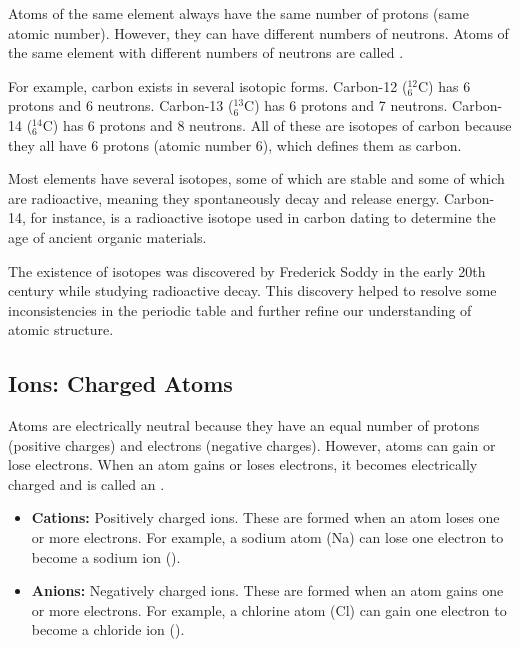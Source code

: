 Atoms of the same element always have the same number of protons (same atomic number). However, they can have different numbers of neutrons. Atoms of the same element with different numbers of neutrons are called .

For example, carbon exists in several isotopic forms.  Carbon-12 ($^{12}_{6}\text{C}$) has 6 protons and 6 neutrons. Carbon-13 ($^{13}_{6}\text{C}$) has 6 protons and 7 neutrons. Carbon-14 ($^{14}_{6}\text{C}$) has 6 protons and 8 neutrons. All of these are isotopes of carbon because they all have 6 protons (atomic number 6), which defines them as carbon.

Most elements have several isotopes, some of which are stable and some of which are radioactive, meaning they spontaneously decay and release energy. Carbon-14, for instance, is a radioactive isotope used in carbon dating to determine the age of ancient organic materials.

\begin{marginnote}
 The existence of isotopes was discovered by Frederick Soddy in the early 20th century while studying radioactive decay.  This discovery helped to resolve some inconsistencies in the periodic table and further refine our understanding of atomic structure.
\end{marginnote}

\subsection{Ions: Charged Atoms}

Atoms are electrically neutral because they have an equal number of protons (positive charges) and electrons (negative charges). However, atoms can gain or lose electrons. When an atom gains or loses electrons, it becomes electrically charged and is called an .

\begin{itemize}
    \item \textbf{Cations:}  Positively charged ions. These are formed when an atom loses one or more electrons. For example, a sodium atom (Na) can lose one electron to become a sodium ion ().
    \item \textbf{Anions:} Negatively charged ions. These are formed when an atom gains one or more electrons. For example, a chlorine atom (Cl) can gain one electron to become a chloride ion ().
\end{itemize}

